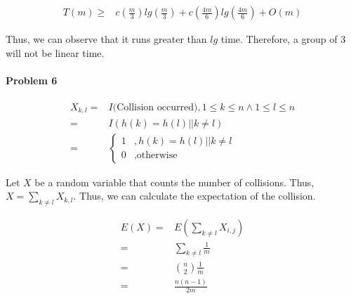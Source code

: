 \documentclass[11pt]{article}
\begin{document}
\begin{equation*}
\begin {split}
    T(m) \geq& c(\frac{m}{3})lg(\frac{m}{3}) + c(\frac{4m}{6})lg(\frac{4m}{6}) + O(m) 
\end {split}
\end{equation*}
\begin{flushleft}
    Thus, we can observe that it runs greater than $lg$ time. Therefore, a group of 3 will not be linear time.
\end{flushleft}     
\paragraph{\noindent\textbf{\LARGE{Problem 6}}}
\begin{equation*}
\begin {split}
    X_{k,l} =& I \text{(Collision occurred)}, 1 \leq k \leq n \wedge 1 \leq l \leq n\\
            =& I (h(k) = h(l) || k \neq l) \\
            =&  
            \begin{cases}
              1 & ,h(k) = h(l) || k \neq l\\
              0 & ,\text{otherwise}
\end{cases} 
\end {split}
\end{equation*}
\begin{flushleft}
    Let $X$ be a random variable that counts the number of collisions. Thus, $X = \sum_{k \neq l} X_{k,l}$.
    \newline
    \newline
    Thus, we can calculate the expectation of the collision.
\end{flushleft} 
\begin{equation*}
\begin {split}
    E(X)    =& E(\sum_{k \neq l} X_{i,j}) \\
            =& \sum_{k \neq l} \frac{1}{m} \\
            =&  {n \choose 2} \frac{1}{m} \\
            =& \frac{n(n-1)}{2m}
\end {split}
\end{equation*}

\end{document}
